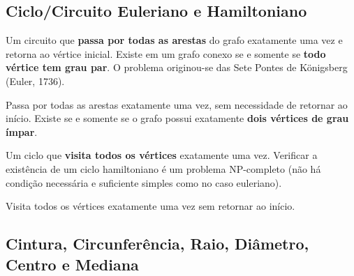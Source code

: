 \documentclass[12pt,a4paper]{article}
\begin{document}
\subsection{Ciclo/Circuito Euleriano e Hamiltoniano}

\begin{description}[leftmargin=0pt]
  \item[Ciclo/Circuito Euleriano] Um circuito que \textbf{passa por todas as arestas} do grafo exatamente uma vez e retorna ao vértice inicial. Existe em um grafo conexo se e somente se \textbf{todo vértice tem grau par}. O problema originou-se das Sete Pontes de Königsberg (Euler, 1736).

  \item[Caminho Euleriano] Passa por todas as arestas exatamente uma vez, sem necessidade de retornar ao início. Existe se e somente se o grafo possui exatamente \textbf{dois vértices de grau ímpar}.

  \item[Ciclo/Circuito Hamiltoniano] Um ciclo que \textbf{visita todos os vértices} exatamente uma vez. Verificar a existência de um ciclo hamiltoniano é um problema NP-completo (não há condição necessária e suficiente simples como no caso euleriano).

  \item[Caminho Hamiltoniano] Visita todos os vértices exatamente uma vez sem retornar ao início.
\end{description}

\subsection{Cintura, Circunferência, Raio, Diâmetro, Centro e Mediana}
\end{document}
